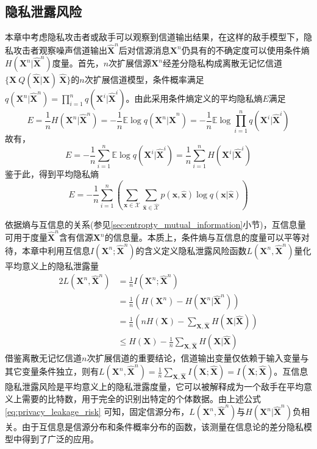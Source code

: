\subsection{隐私泄露风险}
本章中考虑隐私攻击者或敌手可以观察到信道输出结果，在这样的敌手模型下，隐私攻击者观察噪声信道输出$\hat{\bm{X}}^n$后对信源消息$\bm{X}^n$仍具有的不确定度可以使用条件熵$H(\bm{X}^n|\hat{\bm{X}}^n)$度量。首先，$n$次扩展信源$\bm{X}^n$经差分隐私构成离散无记忆信道$\{\bm{X}~Q(\hat{\bm{X}}|\bm{X})~\hat{\bm{X}}\}$的$n$次扩展信道模型，条件概率满足$q(\bm{X}^{n}|\hat{\bm{X}}^n)=\prod_{i=1}^{n}q(\bm{X}^i|\hat{\bm{X}}^i)$。由此采用条件熵定义的平均隐私熵$E$满足
\begin{equation}
	E=\frac{1}{n}H(\bm{X}^{n}|\hat{\bm{X}}^n) = -\frac{1}{n}\mathbb{E} \log q(\bm{X}^{n}|\hat{\bm{X}}^n)= -\frac{1}{n}\mathbb{E} \log \prod_{i=1}^{n}q(\bm{X}^i|\hat{\bm{X}}^i)
\end{equation}
故有，
\begin{equation}
	E= -\frac{1}{n}\sum_{i=1}^{n}\mathbb{E} \log q(\bm{X}^i|\hat{\bm{X}}^i) = \frac{1}{n}\sum_{i=1}^{n}H(\bm{X}^i|\hat{\bm{X}}^i)
\end{equation}
鉴于此，得到平均隐私熵
\begin{equation}
	E=  -\frac{1}{n}\sum_{i=1}^{n}\left(\sum_{\bm{x} \in \mathcal{X}}\sum_{\hat{\bm{x}} \in \hat{\mathcal{X}}}p(\bm{x},\hat{\bm{x}})\log q(\bm{x}|\hat{\bm{x}})\right)
\end{equation}

依据熵与互信息的关系(参见\ref{sec:entropty_mutual_information}小节)，互信息量可用于度量$\hat{\bm{X}}^{n}$含有信源$\bm{X}^n$的信息量。本质上，条件熵与互信息的度量可以平等对待，本章中利用互信息$I(\bm{X}^{n};\hat{\bm{X}}^{n})$的含义定义隐私泄露风险函数$L(\bm{X}^{n},\hat{\bm{X}}^{n})$量化平均意义上的隐私泄露量
\begin{alignat}{2}
	L(\bm{X}^{n},\hat{\bm{X}}^{n}) & = \frac{1}{n}I\left(\bm{X}^{n};\hat{\bm{X}}^{n}\right)\\
	& = \frac{1}{n}\left(H(\bm{X}^{n})-H(\bm{X}^{n}|\hat{\bm{X}}^{n})\right)\label{eq:privacy_leakage_risk}\\
	&=\frac{1}{n}\left (nH(\bm{X})-\sum_{\bm{X},\hat{\bm{X}}}H(\bm{X}|\hat{\bm{X}})\right )\\
	& \leq H(\bm{X})-\frac{1}{n}\sum_{\bm{X},\hat{\bm{X}}}H(\bm{X}|\hat{\bm{X}})
\end{alignat}
借鉴离散无记忆信道$n$次扩展信道的重要结论，信道输出变量仅依赖于输入变量与其它变量条件独立，则有$	L(\bm{X}^{n},\hat{\bm{X}}^{n})=\frac{1}{n}\sum_{\bm{X},\hat{\bm{X}}}I(\bm{X};\hat{\bm{X}})=I(\bm{X};\hat{\bm{X}})$。互信息隐私泄露风险是平均意义上的隐私泄露度量，它可以被解释成为一个敌手在平均意义上需要的比特数，用于完全的识别出特定的个体数据\cite{oya2017back}。由上述公式\ref{eq:privacy_leakage_risk} 可知，固定信源分布，$L(\bm{X}^{n},\hat{\bm{X}}^{n})$与$H(\bm{X}^{n}|\hat{\bm{X}}^{n})$负相关。由于互信息是信源分布和条件概率分布的函数，该测量在信息论的差分隐私模型中得到了广泛的应用。

